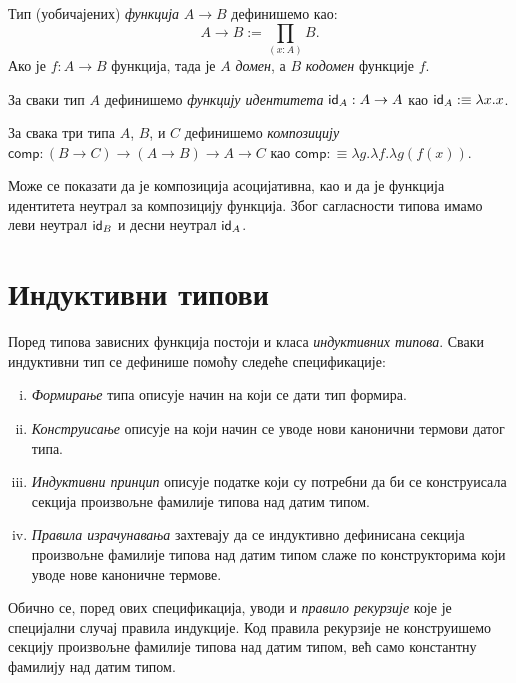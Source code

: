 \documentclass[12pt,oneside]{memoir}
\begin{document}
\begin{definition}
    Тип (уобичајених) \emph{функција} $A \to B$ дефинишемо као:
    \[A \to B:= \prod_{(x:A)} B.\]
    Ако је $f : A \to B$ функција, тада је $A$ \emph{домен}, а $B$ \emph{кодомен} функције $f$. 
\end{definition}

\begin{definition}
    За сваки тип $A$ дефинишемо \emph{функцију идентитета} $\mathsf{id}_{A} : A \to A$ као $\mathsf{id}_{A} :\equiv \lambda x.x$.
\end{definition}

\begin{definition}
    За свака три типа $A$, $B$, и $C$ дефинишемо \emph{композицију} $\mathsf{comp} : (B \to C) \to (A \to B) \to A \to C$ као $\mathsf{comp} :\equiv \lambda g.\lambda f.\lambda  g(f(x))$.
\end{definition}
Може се показати да је композиција асоцијативна, као и да је функција идентитета неутрал за композицију функција. Због сагласности типова имамо леви неутрал $\mathsf{id}_{B}$ и десни неутрал $\mathsf{id}_{A}$.

\section{Индуктивни типови}

Поред типова зависних функција постоји и класа \emph{индуктивних типова}. Сваки индуктивни тип се дефинише помоћу следеће спецификације: 

\begin{enumerate}[(i)]
    \item{\emph{Формирање} типа описује начин на који се дати тип формира.}
    \item{\emph{Конструисање} описује на који начин се уводе нови канонични термови датог типа.}
    \item{\emph{Индуктивни принцип} описује податке који су потребни да би се конструисала секција произвољне фамилије типова над датим типом.}
    \item{\emph{Правила израчунавања} захтевају да се индуктивно дефинисана секција произвољне фамилије типова над датим типом слаже по конструкторима који уводе нове каноничне термове.}
\end{enumerate}

Обично се, поред ових спецификација, уводи и \emph{правило рекурзије} које је специјални случај правила индукције. Код правила рекурзије не конструишемо секцију произвољне фамилије типова над датим типом, већ само константну фамилију над датим типом.
\end{document}
